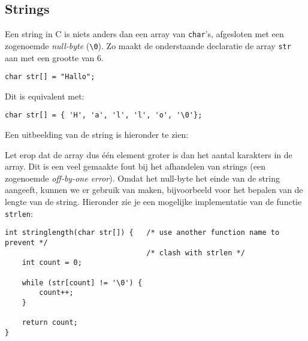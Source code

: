 \documentclass[a4paper,10pt,fleqn,twoside]{article}
\begin{document}
\subsection{Strings}
Een string in C is niets anders dan een array van \lstinline|char|'s, afgesloten met een zogenoemde \textsl{null-byte} (\lstinline|\0|). Zo maakt de onderstaande declaratie de array \lstinline|str| aan met een grootte van 6.

\begin{lstlisting}
char str[] = "Hallo";
\end{lstlisting}

Dit is equivalent met:

\begin{lstlisting}
char str[] = { 'H', 'a', 'l', 'l', 'o', '\0'};
\end{lstlisting}

Een uitbeelding van de string is hieronder te zien:

\begin{figure}[!ht]
\centering
{}
\end{figure}

Let erop dat de array dus één element groter is dan het aantal karakters in de array. Dit is een veel gemaakte fout bij het afhandelen van strings (een zogenoemde \textsl{off-by-one error}). Omdat het null-byte het einde van de string aangeeft, kunnen we er gebruik van maken, bijvoorbeeld voor het bepalen van de lengte van de string. Hieronder zie je een mogelijke implementatie van de functie \lstinline|strlen|:

\begin{lstlisting}
int stringlength(char str[]) {   /* use another function name to prevent */
                                 /* clash with strlen */
	int count = 0;

    while (str[count] != '\0') {
        count++;
    }

	return count;
}
\end{lstlisting}

\end{document}
